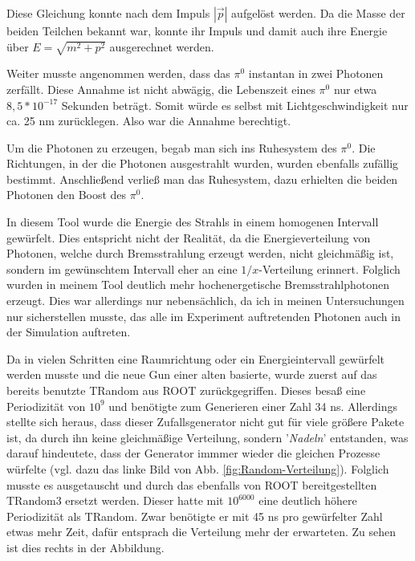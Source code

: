 \documentclass[a4paper,11pt,oneside,final,german,openbib,pdftex]{scrbook}
\begin{document}
{Diese Gleichung konnte nach dem Impuls $|\overrightarrow{p}|$ aufgel\"ost werden. Da die Masse der beiden Teilchen bekannt war, konnte ihr Impuls und damit auch ihre Energie über $E=\sqrt{m^2+p^2}$ ausgerechnet werden. 

Weiter musste angenommen werden, dass das $\pi^0$ instantan in zwei Photonen zerf\"allt. Diese Annahme ist nicht abw\"agig, die Lebenszeit eines $\pi^0$ nur etwa $8,5 * 10^{-17}$ Sekunden betr\"agt. Somit w\"urde es selbst mit Lichtgeschwindigkeit nur ca. 25 nm zur\"ucklegen. Also war die Annahme berechtigt.

Um die Photonen zu erzeugen, begab man sich ins Ruhesystem des $\pi^0$. Die Richtungen, in der die Photonen ausgestrahlt wurden, wurden ebenfalls zuf\"allig bestimmt. Anschlie{\ss}end verlie{\ss} man das Ruhesystem, dazu erhielten die beiden Photonen den Boost des $\pi^0$. 
\newline


In diesem Tool wurde die Energie des Strahls in einem homogenen Intervall gew\"urfelt. Dies entspricht nicht der Realit\"at, da die Energieverteilung von Photonen, welche durch Bremsstrahlung erzeugt werden, nicht gleichm\"a{\ss}ig ist, sondern im gew\"unschtem Intervall eher an eine $1/x$-Verteilung erinnert. Folglich wurden in meinem Tool deutlich mehr hochenergetische Bremsstrahlphotonen erzeugt. Dies war allerdings nur nebensächlich, da ich in meinen Untersuchungen nur sicherstellen musste, das alle im Experiment auftretenden Photonen auch in der Simulation auftreten.

Da in vielen Schritten eine Raumrichtung oder ein Energieintervall gew\"urfelt werden musste und die neue Gun einer alten basierte, wurde zuerst auf das bereits benutzte TRandom aus ROOT zur\"uckgegriffen. Dieses besa{\ss} eine Periodizit\"at von $10^9$ und ben\"otigte zum Generieren einer Zahl 34 ns. Allerdings stellte sich heraus, dass dieser Zufallsgenerator nicht gut f\"ur viele gr\"o{\ss}ere Pakete ist, da durch ihn keine gleichm\"a{\ss}ige Verteilung, sondern '\textit{Nadeln}' entstanden, was darauf hindeutete, dass der Generator immmer wieder die gleichen Prozesse w\"urfelte (vgl. dazu das linke Bild von Abb. \ref{fig:Random-Verteilung}). Folglich musste es ausgetauscht und durch das ebenfalls von ROOT bereitgestellten TRandom3 ersetzt werden. Dieser hatte mit $10^{6000}$ eine deutlich höhere Periodizität als TRandom. Zwar ben\"otigte er mit 45 ns pro gew\"urfelter Zahl etwas mehr Zeit, daf\"ur entsprach die Verteilung mehr der erwarteten. Zu sehen ist dies rechts in der Abbildung.

}
\end{document}
